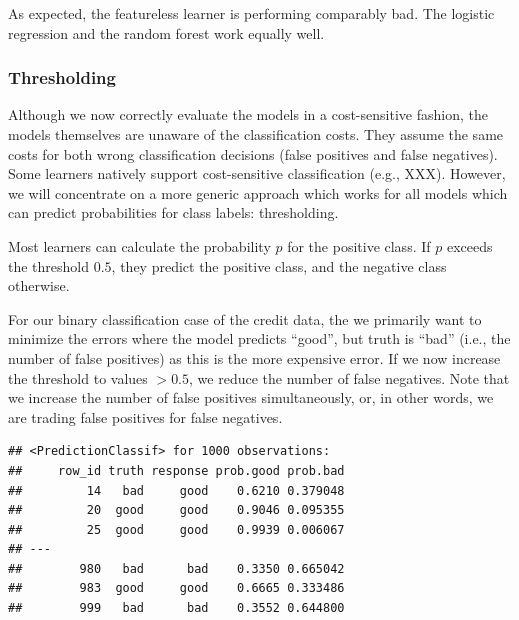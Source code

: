 \documentclass[]{article}
\newenvironment{Shaded}{\begin{snugshade}}{\end{snugshade}}
\newcommand{\CommentTok}[1]{\textcolor[rgb]{0.56,0.35,0.01}{\textit{#1}}}
\newcommand{\DataTypeTok}[1]{\textcolor[rgb]{0.13,0.29,0.53}{#1}}
\newcommand{\KeywordTok}[1]{\textcolor[rgb]{0.13,0.29,0.53}{\textbf{#1}}}
\newcommand{\NormalTok}[1]{#1}
\newcommand{\OperatorTok}[1]{\textcolor[rgb]{0.81,0.36,0.00}{\textbf{#1}}}
\newcommand{\StringTok}[1]{\textcolor[rgb]{0.31,0.60,0.02}{#1}}
\renewenvironment{Shaded} {\begin{snugshade}\small} {\end{snugshade}}
\begin{document}
As expected, the featureless learner is performing comparably bad.
The logistic regression and the random forest work equally well.

\hypertarget{thresholding}{%
\subsubsection{Thresholding}\label{thresholding}}

Although we now correctly evaluate the models in a cost-sensitive fashion, the models themselves are unaware of the classification costs.
They assume the same costs for both wrong classification decisions (false positives and false negatives).
Some learners natively support cost-sensitive classification (e.g., XXX).
However, we will concentrate on a more generic approach which works for all models which can predict probabilities for class labels: thresholding.

Most learners can calculate the probability \(p\) for the positive class.
If \(p\) exceeds the threshold \(0.5\), they predict the positive class, and the negative class otherwise.

For our binary classification case of the credit data, the we primarily want to minimize the errors where the model predicts ``good'', but truth is ``bad'' (i.e., the number of false positives) as this is the more expensive error.
If we now increase the threshold to values \(> 0.5\), we reduce the number of false negatives.
Note that we increase the number of false positives simultaneously, or, in other words, we are trading false positives for false negatives.

\begin{Shaded}
\end{Shaded}

\begin{verbatim}
## <PredictionClassif> for 1000 observations:
##     row_id truth response prob.good prob.bad
##         14   bad     good    0.6210 0.379048
##         20  good     good    0.9046 0.095355
##         25  good     good    0.9939 0.006067
## ---                                         
##        980   bad      bad    0.3350 0.665042
##        983  good     good    0.6665 0.333486
##        999   bad      bad    0.3552 0.644800
\end{verbatim}
\end{document}
